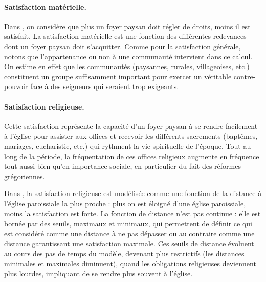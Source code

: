 \paragraph{Satisfaction matérielle.}

\begin{tcolorbox}[breakable,left=0pt,right=0pt,top=0pt,bottom=0pt,
	colback=gray!15,colframe=gray!15,width=\dimexpr\textwidth\relax, 
	enlarge left by=0mm, boxsep=5pt,arc=0pt,outer arc=0pt]
Dans \simfeodal{}, on considère que plus un foyer paysan doit régler de droits, moins il est satisfait.
La satisfaction matérielle est une fonction des différentes redevances dont un foyer paysan doit s'acquitter.
Comme pour la satisfaction générale, notons que l'appartenance ou non à une communauté intervient dans ce calcul.
On estime en effet que les communautés (paysannes, rurales, villageoises, etc.) constituent un groupe suffisamment important pour exercer un véritable contre-pouvoir face à des seigneurs qui seraient trop exigeants.
\end{tcolorbox}

\paragraph{Satisfaction religieuse.}

Cette satisfaction représente la capacité d'un foyer paysan à se rendre facilement à l'église pour assister aux offices et recevoir les différents sacrements (baptêmes, mariages, eucharistie, etc.) qui rythment la vie spirituelle de l'époque.
Tout au long de la période, la fréquentation de ces offices religieux augmente en fréquence tout aussi bien qu'en importance sociale, en particulier du fait des réformes grégoriennes.

\begin{tcolorbox}[breakable,left=0pt,right=0pt,top=0pt,bottom=0pt,
	colback=gray!15,colframe=gray!15,width=\dimexpr\textwidth\relax, 
	enlarge left by=0mm, boxsep=5pt,arc=0pt,outer arc=0pt]
Dans \simfeodal{}, la satisfaction religieuse est modélisée comme une fonction de la distance à l'église paroissiale la plus proche : plus on est éloigné d'une église paroissiale, moins la satisfaction est forte.
La fonction de distance n'est pas continue : elle est bornée par des seuils, maximaux et minimaux, qui permettent de définir ce qui est considéré comme une distance à ne pas dépasser ou au contraire comme une distance garantissant une satisfaction maximale.
Ces seuils de distance évoluent au cours des pas de temps du modèle, devenant plus restrictifs (les distances minimales et maximales diminuent), quand les obligations religieuses deviennent plus lourdes, impliquant de se rendre plus souvent à l'église.
\end{tcolorbox}

